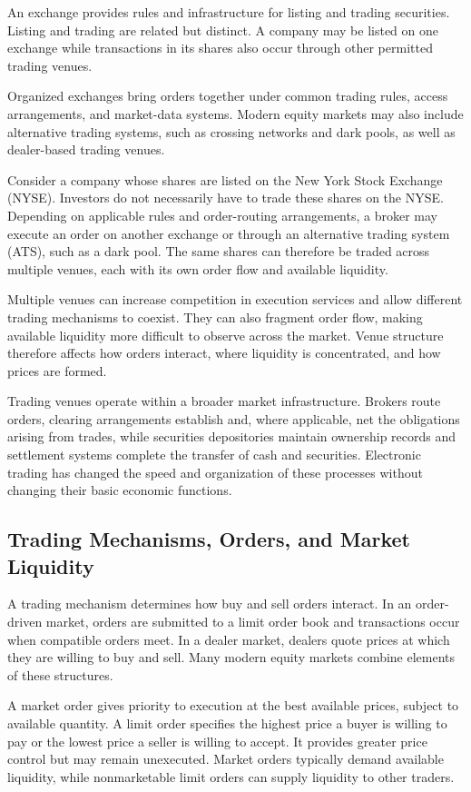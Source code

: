 An exchange provides rules and infrastructure for listing and trading securities. Listing and trading are related but distinct. A company may be listed on one exchange while transactions in its shares also occur through other permitted trading venues.

Organized exchanges bring orders together under
common trading rules, access arrangements, and
market-data systems. Modern equity markets may
also include alternative trading systems, such as
crossing networks and dark pools, as well as
dealer-based trading venues.

Consider a company whose shares are listed on the
New York Stock Exchange (NYSE). Investors do not
necessarily have to trade these shares on the NYSE.
Depending on applicable rules and order-routing
arrangements, a broker may execute an order on
another exchange or through an alternative trading
system (ATS), such as a dark pool. The same shares
can therefore be traded across multiple venues,
each with its own order flow and available liquidity.

Multiple venues can increase competition in execution services and allow different trading mechanisms to coexist. They can also fragment order flow, making available liquidity more difficult to observe across the market. Venue structure therefore affects how orders interact, where liquidity is concentrated, and how prices are formed.

Trading venues operate within a broader market
infrastructure. Brokers route orders, clearing
arrangements establish and, where applicable,
net the obligations arising from trades, while
securities depositories maintain ownership records
and settlement systems complete the transfer of
cash and securities. Electronic trading has changed
the speed and organization of these processes
without changing their basic economic functions.

\subsection{Trading Mechanisms, Orders, and Market Liquidity}

A trading mechanism determines how buy and sell orders interact. In an order-driven market, orders are submitted to a limit order book and transactions occur when compatible orders meet. In a dealer market, dealers quote prices at which they are willing to buy and sell. Many modern equity markets combine elements of these structures.

A market order gives priority to execution at the best available prices, subject to available quantity. A limit order specifies the highest price a buyer is willing to pay or the lowest price a seller is willing to accept. It provides greater price control but may remain unexecuted. Market orders typically demand available liquidity, while nonmarketable limit orders can supply liquidity to other traders.

